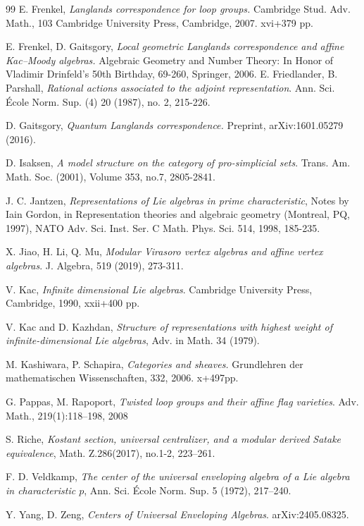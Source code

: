 \documentclass{amsart}
\theoremstyle{definition}
\numberwithin{equation}{section}
\begin{document}
\begin{thebibliography}{99}
 E. Frenkel,
{\em Langlands correspondence for loop groups.} Cambridge Stud. Adv. Math., 103
Cambridge University Press, Cambridge, 2007. xvi+379 pp.


 E. Frenkel, D. Gaitsgory, {\it Local geometric Langlands correspondence and affine Kac--Moody algebras.} Algebraic Geometry and Number Theory: In Honor of Vladimir Drinfeld’s 50th Birthday, 69-260, Springer, 2006.  
 E. Friedlander, B. Parshall, {\it Rational actions associated to the adjoint representation}. Ann. Sci. \'{E}cole Norm. Sup. (4) 20 (1987), no. 2, 215-226.

 D. Gaitsgory, {\it Quantum Langlands correspondence.} Preprint, arXiv:1601.05279 (2016). 

 D. Isaksen,
{\em A model structure on the category of pro-simplicial sets}. Trans. Am. Math. Soc. (2001), Volume 353, no.7, 2805-2841.

  J. C. Jantzen, {\it Representations of Lie algebras in prime characteristic}, Notes by Iain
Gordon, in Representation theories and algebraic geometry (Montreal, PQ, 1997), NATO Adv. Sci. Inst. Ser. C Math. Phys. Sci. 514, 1998, 185-235.

 X. Jiao, H. Li, Q. Mu, {\it 
Modular Virasoro vertex algebras and affine vertex algebras}. J. Algebra, 519 (2019), 273-311.

 V. Kac, {\it Infinite dimensional Lie algebras}. Cambridge University Press, Cambridge, 1990, xxii+400 pp.

 V. Kac and D. Kazhdan, {\it Structure of representations with highest weight of infinite-dimensional Lie
algebras}, Adv. in Math. 34 (1979).

 M. Kashiwara, P. Schapira, {\em Categories and sheaves.} Grundlehren der mathematischen Wissenschaften, 332, 2006. x+497pp. 

 G. Pappas, M. Rapoport, 
{\it Twisted loop groups and their affine flag varieties}. Adv. Math.,
219(1):118–198, 2008

 S. Riche, {\it Kostant section, universal centralizer, and a modular derived Satake equivalence}, Math. Z.286(2017), no.1-2, 223–261.

  F. D. Veldkamp, {\it The center of the universal enveloping algebra of a Lie algebra in
characteristic $p$}, Ann. Sci. \'{E}cole Norm. Sup.  5 (1972), 217–240.

 Y. Yang, D. Zeng, {\it Centers of Universal Enveloping Algebras}. arXiv:2405.08325.
\end{thebibliography}
\end{document}
